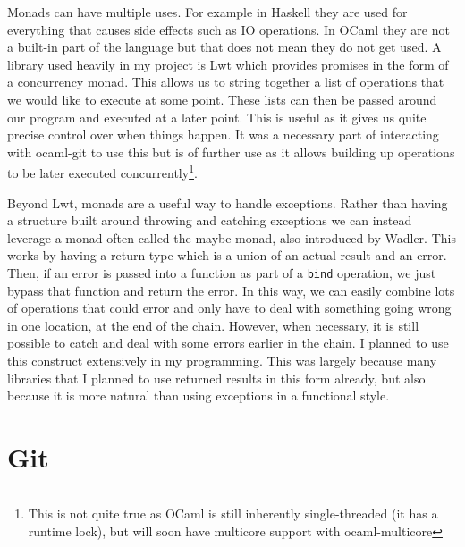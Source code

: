 Monads can have multiple uses. For example in Haskell they are used for everything that causes side effects such as IO operations. In OCaml they are not a built-in part of the language but that does not mean they do not get used. A library used heavily in my project is Lwt\cite{code_lwt} which provides promises\cite{Liskov1988} in the form of a concurrency monad. This allows us to string together a list of operations that we would like to execute at some point. These lists can then be passed around our program and executed at a later point. This is useful as it gives us quite precise control over when things happen. It was a necessary part of interacting with ocaml-git to use this but is of further use as it allows building up operations to be later executed concurrently\footnote{This is not quite true as OCaml is still inherently single-threaded (it has a runtime lock), but will soon have multicore support with ocaml-multicore\cite{dolan2014multicore}}.

Beyond Lwt, monads are a useful way to handle exceptions. Rather than having a structure built around throwing and catching exceptions we can instead leverage a monad often called the maybe monad, also introduced by Wadler\cite{wadler90monads}. This works by having a return type which is a union of an actual result and an error. Then, if an error is passed into a function as part of a \texttt{bind} operation, we just bypass that function and return the error. In this way, we can easily combine lots of operations that could error and only have to deal with something going wrong in one location, at the end of the chain. However, when necessary, it is still possible to catch and deal with some errors earlier in the chain. I planned to use this construct extensively in my programming. This was largely because many libraries that I planned to use returned results in this form already, but also because it is more natural than using exceptions in a functional style.

\section{Git}

